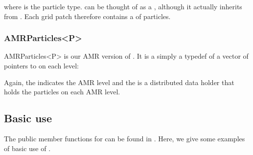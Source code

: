\documentclass[letterpaper,10pt,english]{sphinxmanual}
\begin{document}
\begin{sphinxVerbatim}[commandchars=\\\{\},formatcom=\scriptsize]
  
\end{sphinxVerbatim}

where  is the particle type.
 can be thought of as a , although it actually inherits from .
Each grid patch therefore contains a  of particles.


\subsubsection{AMRParticles\textless{}P\textgreater{}}
\label{\detokenize{Source/Particles:amrparticles-p}}
AMRParticles\textless{}P\textgreater{} is our AMR version of .
It is a simply a typedef of a vector of pointers to  on each level:

\begin{sphinxVerbatim}[commandchars=\\\{\},formatcom=\scriptsize]
  
     
\end{sphinxVerbatim}

Again, the  indicates the AMR level and the  is a distributed data holder that holds the particles on each AMR level.


\subsection{Basic use}
\label{\detokenize{Source/Particles:basic-use}}
The public member functions for  can be found in .
Here, we give some examples of basic use of .
\end{document}

